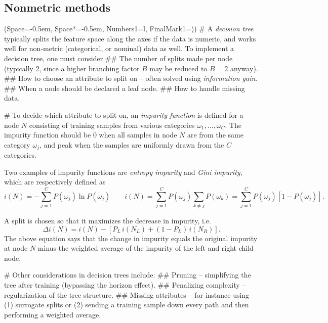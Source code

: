 \documentclass[12pt, a4paper]{article}
\newcommand{\listSpace}{-0.5em}%
\begin{document}
\subsection{Nonmetric methods}
\begin{easylist}[itemize]
\ListProperties(Space=\listSpace, Space*=\listSpace, Numbers1=l, FinalMark1={)})
# A \emph{decision tree} typically splits the feature space along the axes if the data is numeric, and works well for non-metric (categorical, or nominal) data as well.
To implement a decision tree, one must consider
## The number of splits made per node (typically 2, since a higher branching factor $B$ may be reduced to $B=2$ anyway).
## How to choose an attribute to split on -- often solved using \emph{information gain}.
## When a node should be declared a leaf node.
## How to handle missing data.

# To decide which attribute to split on, an \emph{impurity function} is defined for a node $N$ consisting of training samples from various categories $\omega_1, \dots, \omega_C$.
The impurity function should be 0 when all samples in node $N$ are from the same category $\omega_j$, and peak when the samples are uniformly drawn from the $C$ categories.

Two examples of impurity functions are \emph{entropy impurity} and \emph{Gini impurity}, which are respectively defined as
\begin{equation*}
	i(N) = - \sum_{j=1}^{C} P(\omega_j) \ln P(\omega_j) 
	\qquad
	i(N) =  \sum_{j=1}^{C} P(\omega_j) \sum_{k\neq j} P(\omega_k)
	= \sum_{j=1}^{C} P(\omega_j) \left[ 1 - P(\omega_j) \right].
\end{equation*}

A split is chosen so that it maximizes the decrease in impurity, i.e.
\begin{equation*}
	\Delta i(N) = i(N) - \left[ P_L \, i(N_L) + (1 - P_L) \, i(N_R)\right].
\end{equation*}
The above equation says that the change in impurity equals the original impurity at node $N$ minus the weighted average of the impurity of the left and right child node.

# Other considerations in decision trees include:
## Pruning -- simplifying the tree after training (bypassing the horizon effect).
## Penalizing complexity -- regularization of the tree structure.
## Missing attributes -- for instance using (1) surrogate splits or (2) sending a training sample down every path and then performing a weighted average.


\end{easylist}
\end{document}
